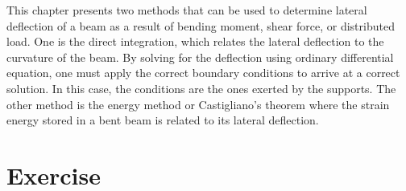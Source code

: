 \documentclass[
10pt,
a4paper,
openany,
svgnames,
]{kaobook} %
\begin{document}
This chapter presents two methods that can be used to determine lateral deflection of a beam as a result of bending moment, shear force, or distributed load. One is the direct integration, which relates the lateral deflection to the curvature of the beam. By solving for the deflection using ordinary differential equation, one must apply the correct boundary conditions to arrive at a correct solution. In this case, the conditions are the ones exerted by the supports. The other method is the energy method or Castigliano’s theorem where the strain energy stored in a bent beam is related to its lateral deflection.

\section*{Exercise}
\end{document}
